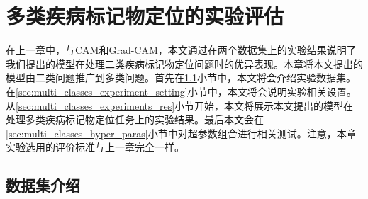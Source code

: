 \chapter{多类疾病标记物定位的实验评估}\label{sec:multi_classes}
在上一章中，与CAM和Grad-CAM，本文通过在两个数据集上的实验结果说明了我们提出的模型在处理二类疾病标记物定位问题时的优异表现。本章将本文提出的模型由二类问题推广到多类问题。首先在\ref{sec:mul_classes_ds_intro}小节中，本文将会介绍实验数据集。在\ref{sec:multi_classes_experiment_setting}小节中，本文将会说明实验相关设置。从\ref{sec:multi_classes_experiments_res}小节开始，本文将展示本文提出的模型在处理多类疾病标记物定位任务上的实验结果。最后本文会在\ref{sec:multi_classes_hyper_paras}小节中对超参数组合进行相关测试。注意，本章实验选用的评价标准与上一章完全一样。
\section{数据集介绍}\label{sec:mul_classes_ds_intro}
